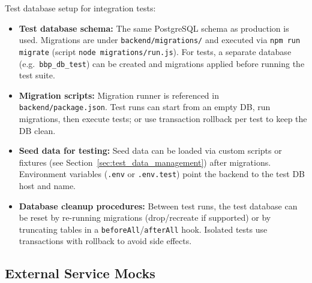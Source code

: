 Test database setup for integration tests:
\begin{itemize}
    \item \textbf{Test database schema:} The same PostgreSQL schema as production is used. Migrations are under \texttt{backend/migrations/} and executed via \texttt{npm run migrate} (script \texttt{node migrations/run.js}). For tests, a separate database (e.g.\ \texttt{bbp\_db\_test}) can be created and migrations applied before running the test suite.
    \item \textbf{Migration scripts:} Migration runner is referenced in \texttt{backend/package.json}. Test runs can start from an empty DB, run migrations, then execute tests; or use transaction rollback per test to keep the DB clean.
    \item \textbf{Seed data for testing:} Seed data can be loaded via custom scripts or fixtures (see Section~\ref{sec:test_data_management}) after migrations. Environment variables (\texttt{.env} or \texttt{.env.test}) point the backend to the test DB host and name.
    \item \textbf{Database cleanup procedures:} Between test runs, the test database can be reset by re-running migrations (drop/recreate if supported) or by truncating tables in a \texttt{beforeAll}/\texttt{afterAll} hook. Isolated tests use transactions with rollback to avoid side effects.
\end{itemize}

\subsection{External Service Mocks}
\label{subsec:external_service_mocks}%

